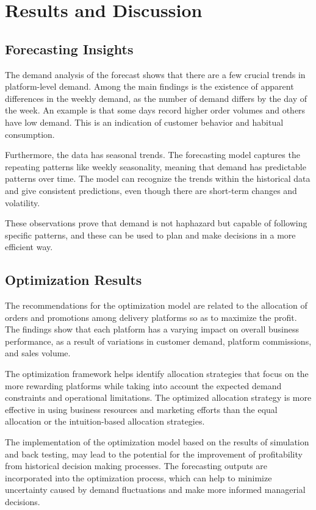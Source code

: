 \section{Results and Discussion}

\subsection{Forecasting Insights}

The demand analysis of the forecast shows that there are a few crucial trends in platform-level demand. Among the main findings is the existence of apparent differences in the weekly demand, as the number of demand differs by the day of the week. An example is that some days record higher order volumes and others have low demand. This is an indication of customer behavior and habitual consumption. 

Furthermore, the data has seasonal trends. The forecasting model captures the repeating patterns like weekly seasonality, meaning that demand has predictable patterns over time. The model can recognize the trends within the historical data and give consistent predictions, even though there are short-term changes and volatility. 

These observations prove that demand is not haphazard but capable of following specific patterns, and these can be used to plan and make decisions in a more efficient way.


\subsection{Optimization Results}

The recommendations for the optimization model are related to the allocation of orders and promotions among delivery platforms so as to maximize the profit. The findings show that each platform has a varying impact on overall business performance, as a result of variations in customer demand, platform commissions, and sales volume.

The optimization framework helps identify allocation strategies that focus on the more rewarding platforms while taking into account the expected demand constraints and operational limitations. The optimized allocation strategy is more effective in using business resources and marketing efforts than the equal allocation or the intuition-based allocation strategies.

The implementation of the optimization model based on the results of simulation and back testing, may lead to the potential for the improvement of profitability from historical decision making processes. The forecasting outputs are incorporated into the optimization process, which can help to minimize uncertainty caused by demand fluctuations and make more informed managerial decisions.

